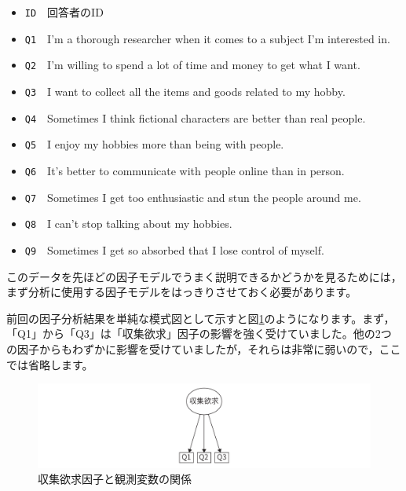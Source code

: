 \documentclass[
  12pt,
  a5jpaper,
  lualatex, ja=standard]{bxjsbook}
\providecommand{\tightlist}{%
  \setlength{\itemsep}{0pt}\setlength{\parskip}{0pt}}
\newenvironment{jmvvar}{%
	\begin{center}%
	\begin{tcolorbox}[%
		title=変数一覧,
		colframe=daidai,
		colbacktitle=daidai!30!white,
		coltitle=daidai!10!black,
		colback=daidai!2!white,
		breakable,
		width=.9\textwidth
		]\small\addtolength{\leftmargini}{-3\labelsep}%
	}%
	{\end{tcolorbox}\end{center}}
\begin{document}
\begin{jmvvar}

\begin{itemize}
\tightlist
\item
  \texttt{ID}　回答者のID
\item
  \texttt{Q1}　I'm a thorough researcher when it comes to a subject I'm interested in.
\item
  \texttt{Q2}　I'm willing to spend a lot of time and money to get what I want.
\item
  \texttt{Q3}　I want to collect all the items and goods related to my hobby.
\item
  \texttt{Q4}　Sometimes I think fictional characters are better than real people.
\item
  \texttt{Q5}　I enjoy my hobbies more than being with people.
\item
  \texttt{Q6}　It's better to communicate with people online than in person.
\item
  \texttt{Q7}　Sometimes I get too enthusiastic and stun the people around me.
\item
  \texttt{Q8}　I can't stop talking about my hobbies.
\item
  \texttt{Q9}　Sometimes I get so absorbed that I lose control of myself.
\end{itemize}

\end{jmvvar}

このデータを先ほどの因子モデルでうまく説明できるかどうかを見るためには，まず分析に使用する因子モデルをはっきりさせておく必要があります。

前回の因子分析結果を単純な模式図として示すと図\ref{fig:factor-cfa-model1}のようになります。まず，「Q1」から「Q3」は「収集欲求」因子の影響を強く受けていました。他の2つの因子からもわずかに影響を受けていましたが，それらは非常に弱いので，ここでは省略します。

\begin{figure}[!ht]

{\centering \includegraphics[width=1\linewidth]{images/factor/cfa-model1} 

}

\caption{収集欲求因子と観測変数の関係}\label{fig:factor-cfa-model1}
\end{figure}
\end{document}
